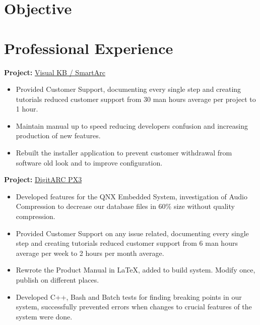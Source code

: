 \documentclass{scrartcl}
\begin{document}
\begin{minipage}[t]{0.69\textwidth}
	\section*{Objective}
		
		
\section*{Professional Experience}
	
	\textbf{Project:} \href{http://amige.com/meltshops_technological_controls_smartarc.html}{Visual KB / SmartArc}
	\begin{itemize}[noitemsep]
		\item Provided Customer Support, documenting every single step and creating tutorials reduced customer support from 30 man hours average per project to 1 hour.
		\item Maintain manual up to speed reducing developers confusion and increasing production of new features.
		\item Rebuilt the installer application to prevent customer withdrawal from software old look and to improve configuration. 
	\end{itemize}
	
	\textbf{Project:} \href{http://amige.com/meltshops_technological_controls_digitarc_px3.html}{DigitARC PX3}
	\begin{itemize}[noitemsep]
		\item Developed features for the QNX Embedded System, investigation of Audio Compression to decrease our database files in 60\% size without quality compression.
		\item Provided Customer Support on any issue related, documenting every single step and creating tutorials reduced customer support from 6 man hours average per week to 2 hours per month average.
	\item Rewrote the Product Manual in \LaTeX, added to build system. Modify once, publish on different places.
	\item Developed C++, Bash and Batch tests for finding breaking points in our system, successfully prevented errors when changes to crucial features of the system were done.
	\end{itemize}
\end{minipage}
\hfill
\end{document}
